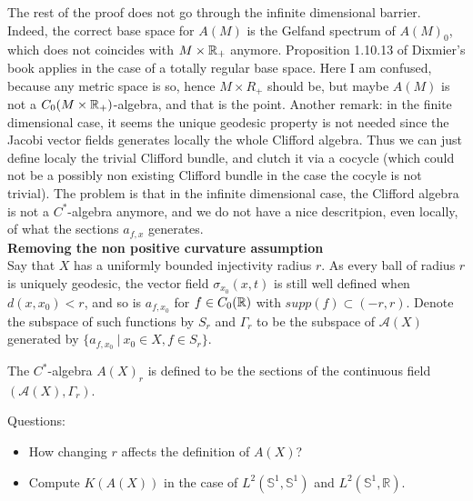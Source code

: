The rest of the proof does not go through the infinite dimensional barrier. Indeed, the correct base space for $A(M)$ is the Gelfand spectrum of $A(M)_0$, which does not coincides with $M\times \mathbb R_+$ anymore. Proposition 1.10.13 of Dixmier's book applies in the case of a totally regular base space. Here I am confused, because any metric space is so, hence $M\times R_+$ should be, but maybe $A(M)$ is not a $C_0(M\times \mathbb R_+ )$-algebra, and that is the point. Another remark: in the finite dimensional case, it seems the unique geodesic property is not needed since the Jacobi vector fields generates locally the whole Clifford algebra. Thus we can just define localy the trivial Clifford bundle, and clutch it via a cocycle (which could not be a possibly non existing Clifford bundle in the case the cocyle is not trivial). The problem is that in the infinite dimensional case, the Clifford algebra is not a $C^*$-algebra anymore, and we do not have a nice descritpion, even locally, of what the sections $a_{f,x}$ generates.\\ 

\textbf{Removing the non positive curvature assumption}\\

Say that $X$ has a uniformly bounded injectivity radius $r$. As every ball of radius $r$ is uniquely geodesic, the vector field $\sigma_{x_0}(x,t)$ is still well defined when $d(x,x_0)<r$, and so is $a_{f,x_0}$ for $f\in C_0(\mathbb R)$ with $supp(f)\subset (-r,r)$. Denote the subspace of such functions by $S_r$ and $\Gamma_r$ to be the subspace of $\mathcal A(X)$ generated by $\{a_{f,x_0} \ | \ x_0\in X, f\in S_r \}$.

\begin{definition}
The $C^*$-algebra $A(X)_r$ is defined to be the sections of the continuous field $(\mathcal A(X), \Gamma_r)$.
\end{definition}

Questions:
\begin{itemize}
\item How changing $r$ affects the definition of $A(X)$?
\item Compute $K(A(X))$ in the case of $L^2(\mathbb S^1, \mathbb S^1)$ and $L^2(\mathbb S^1, \mathbb R)$. 
\end{itemize}

